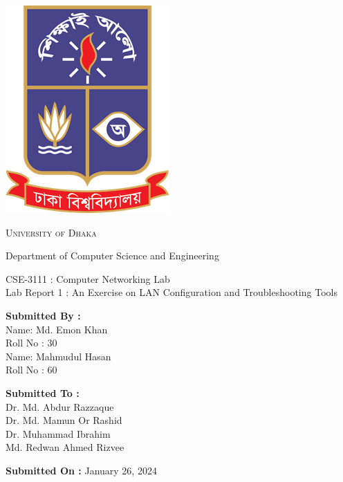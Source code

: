 \documentclass[11pt]{article}
\begin{document}
\begin{titlepage}
    \begin{center}
        \includegraphics[scale=0.35]{du_logo.png}\par
        \begin{Huge}
            \textsc{University of Dhaka}\par
        \end{Huge}
        \begin{Large}
            Department of Computer Science and Engineering\par \vspace{1cm}
            CSE-3111 : Computer Networking Lab \\[12pt]    
            Lab Report 1 : An Exercise on LAN Configuration and Troubleshooting Tools
        \end{Large}
    \end{center}
    
    \vfill
    
    \begin{large}
        \begin{multicols}{2}
            \noindent
            \textbf{Submitted By :\\[12pt]}
                Name: Md. Emon Khan\\[8pt]
                Roll No : 30\\[12pt]
                Name: Mahmudul Hasan\\[8pt]
                Roll No : 60\\[12pt]
                
            \columnbreak
            
            \noindent
            \textbf{Submitted To :\\[12pt]}
                Dr. Md. Abdur Razzaque\\[12pt]
                Dr. Md. Mamun Or Rashid\\[12pt]
                Dr. Muhammad Ibrahim\\[12pt]
                Md. Redwan Ahmed Rizvee
        \end{multicols}    
    \end{large} 
\textbf{Submitted On :} January 26, 2024\\[20pt]

\end{titlepage}
\end{document}
